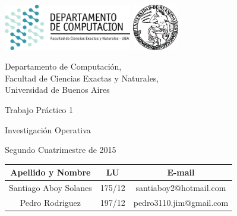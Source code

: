 \documentclass[a4paper, 10pt, twoside]{article}
\begin{document}


\thispagestyle{caratula}

\begin{center}

\includegraphics[height=2cm]{DC.png} 
\hfill
\includegraphics[height=2cm]{UBA.jpg} 

\vspace{2cm}

Departamento de Computación,\\
Facultad de Ciencias Exactas y Naturales,\\
Universidad de Buenos Aires

\vspace{4cm}

\begin{Huge}
Trabajo Práctico 1
\end{Huge}

\vspace{0.5cm}

\begin{Large}
Investigación Operativa
\end{Large}

\vspace{1cm}

Segundo Cuatrimestre de 2015

\vspace{4cm}

\begin{tabular}{|c|c|c|}
\hline
Apellido y Nombre & LU & E-mail\\
\hline
Santiago Aboy Solanes & 175/12 & santiaboy2@hotmail.com \\
Pedro Rodriguez & 197/12 & pedro3110.jim@gmail.com \\
\hline
\end{tabular}

\end{center}
\end{document}
